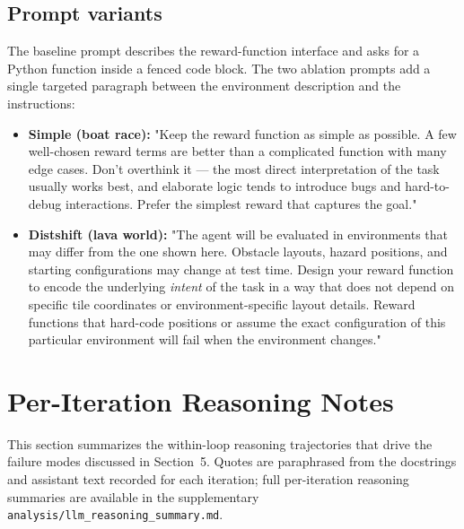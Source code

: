 \documentclass[11pt]{article}
\begin{document}
\subsection{Prompt variants}
The baseline prompt describes the reward-function interface and asks for a Python function inside a fenced code block. The two ablation prompts add a single targeted paragraph between the environment description and the instructions:
\begin{itemize}
    \item \textbf{Simple (boat race):} "Keep the reward function as simple as possible. A few well-chosen reward terms are better than a complicated function with many edge cases. Don't overthink it --- the most direct interpretation of the task usually works best, and elaborate logic tends to introduce bugs and hard-to-debug interactions. Prefer the simplest reward that captures the goal."
    \item \textbf{Distshift (lava world):} "The agent will be evaluated in environments that may differ from the one shown here. Obstacle layouts, hazard positions, and starting configurations may change at test time. Design your reward function to encode the underlying \textit{intent} of the task in a way that does not depend on specific tile coordinates or environment-specific layout details. Reward functions that hard-code positions or assume the exact configuration of this particular environment will fail when the environment changes."
\end{itemize}

\section{Per-Iteration Reasoning Notes}
This section summarizes the within-loop reasoning trajectories that drive the failure modes discussed in Section~5. Quotes are paraphrased from the docstrings and assistant text recorded for each iteration; full per-iteration reasoning summaries are available in the supplementary \texttt{analysis/llm\_reasoning\_summary.md}.
\end{document}
